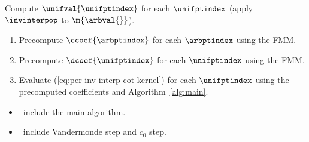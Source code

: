 \begin{centering}
  \begin{algorithm}\label{alg:apply-P-inv}
    Compute $\unifval{\unifptindex}$ for each $\unifptindex$ (apply
    $\invinterpop$ to $\m{\arbval{}}$).
    \begin{enumerate}
    \item Precompute $\ccoef{\arbptindex}$ for each $\arbptindex$ using the FMM.\@
    \item Precompute $\dcoef{\unifptindex}$ for each $\unifptindex$ using the FMM.\@
    \item Evaluate (\ref{eq:per-inv-interp-cot-kernel}) for each
      $\unifptindex$ using the precomputed coefficients and
      Algorithm~\ref{alg:main}.
    \end{enumerate}
  \end{algorithm}
\end{centering}

\begin{itemize}
\item \TODO\ include the main algorithm.
\item \TODO\ include Vandermonde step and $c_0$ step.
\end{itemize}

